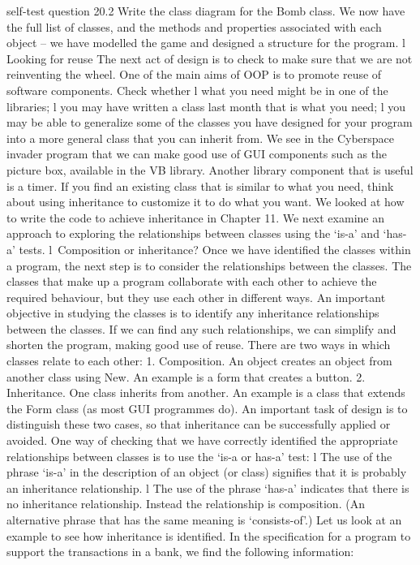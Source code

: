 self-test question
20.2	Write the class diagram for the Bomb class.
We now have the full list of classes, and the methods and properties associated with each object – we have modelled the game and designed a structure for the program.
l Looking for reuse
The next act of design is to check to make sure that we are not reinventing the wheel. One of the main aims of OOP is to promote reuse of software components. Check whether
l	what you need might be in one of the libraries;
l	you may have written a class last month that is what you need;
l	you may be able to generalize some of the classes you have designed for your program into a more general class that you can inherit from.
We see in the Cyberspace invader program that we can make good use of GUI components such as the picture box, available in the VB library. Another library component that is useful is a timer.
If you ﬁnd an existing class that is similar to what you need, think about using 
inheritance to customize it to do what you want. We looked at how to write the code to achieve inheritance in Chapter 11. We next examine an approach to exploring the relationships between classes using the ‘is-a’ and ‘has-a’ tests.
l Composition or inheritance?
Once we have identiﬁed the classes within a program, the next step is to consider the relationships between the classes. The classes that make up a program collaborate with each other to achieve the required behaviour, but they use each other in different ways. An important objective in studying the classes is to identify any inheritance relationships between the classes. If we can ﬁnd any such relationships, we can simplify and shorten the program, making good use of reuse.
There are two ways in which classes relate to each other:
1.	Composition. An object creates an object from another class using New. An example is a form that creates a button.
2.	Inheritance. One class inherits from another. An example is a class that extends the Form class (as most GUI programmes do).
An important task of design is to distinguish these two cases, so that inheritance can be successfully applied or avoided. One way of checking that we have correctly identiﬁed the appropriate relationships between classes is to use the ‘is-a or has-a’ test:
l	The use of the phrase ‘is-a’ in the description of an object (or class) signiﬁes that it is probably an inheritance relationship.
l	The use of the phrase ‘has-a’ indicates that there is no inheritance relationship. Instead the relationship is composition. (An alternative phrase that has the same meaning is ‘consists-of’.)
Let us look at an example to see how inheritance is identiﬁed. In the speciﬁcation for a program to support the transactions in a bank, we ﬁnd the following information:
